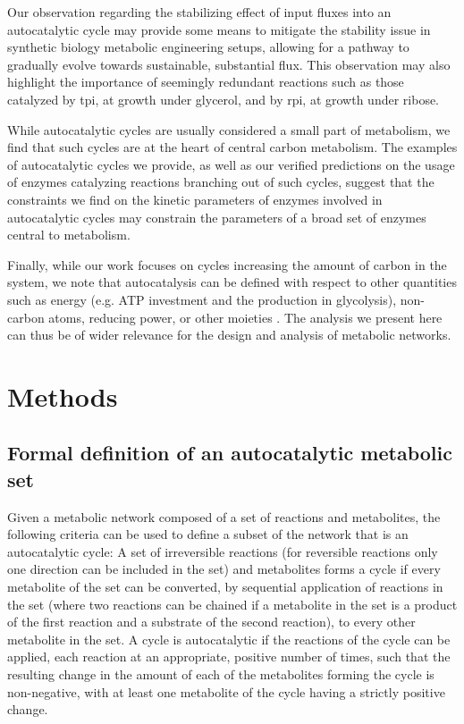 Our observation regarding the stabilizing effect of input fluxes into an autocatalytic cycle may provide some means to mitigate the stability issue in synthetic biology metabolic engineering setups, allowing for a pathway to gradually evolve towards sustainable, substantial flux.
This observation may also highlight the importance of seemingly redundant reactions such as those catalyzed by tpi, at growth under glycerol, and by rpi, at growth under ribose.

While autocatalytic cycles are usually considered a small part of metabolism, we find that such cycles are at the heart of central carbon metabolism.
The examples of autocatalytic cycles we provide, as well as our verified predictions on the usage of enzymes catalyzing reactions branching out of such cycles, suggest that the constraints we find on the kinetic parameters of enzymes involved in autocatalytic cycles may constrain the parameters of a broad set of enzymes central to metabolism.

  Finally, while our work focuses on cycles increasing the amount of carbon in the system, we note that autocatalysis can be defined with respect to other quantities such as energy (e.g. ATP investment and the production in glycolysis), non-carbon atoms, reducing power, or other moieties \cite{Reich1981-qd}.
  The analysis we present here can thus be of wider relevance for the design and analysis of metabolic networks.

  \section{Methods}
  \subsection{Formal definition of an autocatalytic metabolic set}
  Given a metabolic network composed of a set of reactions and metabolites, the following criteria can be used to define a subset of the network that is an autocatalytic cycle:
A set of irreversible reactions (for reversible reactions only one direction can be included in the set) and metabolites forms a cycle if every metabolite of the set can be converted, by sequential application of reactions in the set (where two reactions can be chained if a metabolite in the set is a product of the first reaction and a substrate of the second reaction), to every other metabolite in the set.
A cycle is autocatalytic if the reactions of the cycle can be applied, each reaction at an appropriate, positive number of times, such that the resulting change in the amount of each of the metabolites forming the cycle is non-negative, with at least one metabolite of the cycle having a strictly positive change.

